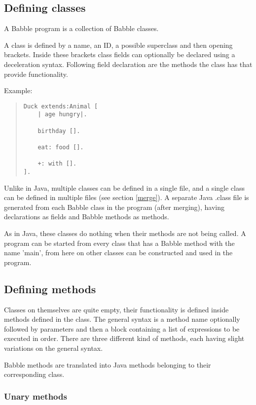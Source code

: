 \documentclass[a4paper]{article}
\begin{document}
\subsection{Defining classes}

A Babble program is a collection of Babble classes.

A class is defined by a name, an ID, a possible superclass and then opening brackets. Inside these brackets class fields can optionally be declared using a deceleration syntax. Following field declaration are the methods the class has that provide functionality.

Example:
\begin{quote}
\begin{lstlisting}
Duck extends:Animal [
	| age hungry|.
	
	birthday [].
	
	eat: food [].
	
	+: with [].
].
\end{lstlisting}
\end{quote}

Unlike in Java, multiple classes can be defined in a single file, and a single class can be defined in multiple files (see section \ref{merge}). A separate Java .class file is generated from each Babble class in the program (after merging), having declarations as fields and Babble methods as methods.

As in Java, these classes do nothing when their methods are not being called. A program can be started from every class that has a Babble method with the name 'main', from here on other classes can be constructed and used in the program.


\subsection{Defining methods}

Classes on themselves are quite empty, their functionality is defined inside methods defined in the class. The general syntax is a method name optionally followed by parameters and then a block containing a list of expressions to be executed in order.
There are three different kind of methods, each having slight variations on the general syntax.

Babble methods are translated into Java methods belonging to their corresponding class.


\subsubsection{Unary methods}
\end{document}
